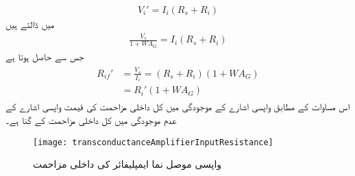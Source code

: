 \begin{align}
V_i'=I_i \left( R_s+R_i\right)
\end{align}
میں ڈالتے  ہیں
\begin{align*}
\frac{V_s}{1+W A_G}=I_i \left( R_s+R_i\right)
\end{align*}
جس سے حاصل ہوتا ہے
\begin{gather}
\begin{aligned}\label{مساوات_واپسی_موصل_نما_کی_داخلی_مزاحمت}
R_{if}'&=\frac{V_s}{I_i}=\left ({R_s+R_i} \right ) \left ({1+W A_G} \right) \\
&={R_i'} \left({1+W A_G} \right )
\end{aligned}
\end{gather}
اس مساوات کے مطابق واپسی اشارے کے موجودگی میں کل داخلی مزاحمت  کی قیمت واپسی اشارے کے عدم موجودگی میں کل داخلی مزاحمت  کے  گنا ہے۔
\begin{figure}
\centering
\texttt{[image: transconductanceAmplifierInputResistance]}
\caption{واپسی موصل نما ایمپلیفائر کی داخلی مزاحمت}
\label{شکل_واپسی_موصلیت_نما_ایمپلیفائر_داخلی_مزاحمت}
\end{figure}

